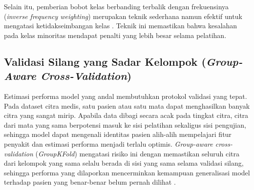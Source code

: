 Selain itu, pemberian bobot kelas berbanding terbalik dengan frekuensinya (\textit{inverse
frequency weighting}) merupakan teknik sederhana namun efektif untuk mengatasi
ketidakseimbangan kelas \citep{Lin2017}. Teknik ini memastikan bahwa kesalahan pada kelas
minoritas mendapat penalti yang lebih besar selama pelatihan.

\subsection{Validasi Silang yang Sadar Kelompok (\textit{Group-Aware Cross-Validation})}

Estimasi performa model yang andal membutuhkan protokol validasi yang tepat. Pada dataset
citra medis, satu pasien atau satu mata dapat menghasilkan banyak citra yang sangat mirip.
Apabila data dibagi secara acak pada tingkat citra, citra dari mata yang sama berpotensi masuk
ke sisi pelatihan sekaligus sisi pengujian, sehingga model dapat mengenali identitas pasien
alih-alih mempelajari fitur penyakit dan estimasi performa menjadi terlalu optimis.
\textit{Group-aware cross-validation} (\textit{GroupKFold}) mengatasi risiko ini dengan
memastikan seluruh citra dari kelompok yang sama selalu berada di sisi yang sama selama
validasi silang, sehingga performa yang dilaporkan mencerminkan kemampuan generalisasi model
terhadap pasien yang benar-benar belum pernah dilihat \citep{Zhao2024}.